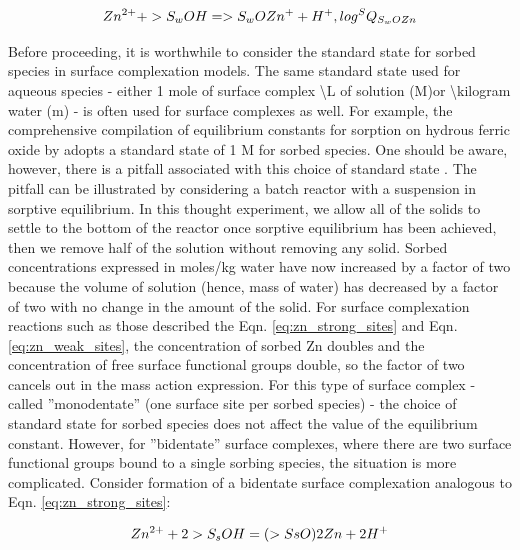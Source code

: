 \begin{equation}
Zn^{2+}  +  >S_wOH  =  >S_wOZn^+  + H^+,  log  ^SQ_{S_wOZn}   \\
\label{eq:zn_weak_sites}
\end{equation} 

Before proceeding, it is worthwhile to consider the standard state for sorbed species 
in surface complexation models. 
The same standard state used for aqueous species - either 1 mole of surface complex \textbackslash L of solution (M)or \textbackslash kilogram water (m) - is often used for surface complexes as well. For example, the comprehensive compilation of equilibrium constants for sorption on hydrous ferric oxide by \cite{Dzombak1990} adopts a standard state of 1 M for sorbed species.  
One should be aware, however, there is a pitfall associated with this choice of 
standard state %
\citep[e.g.,][]{appelo_postma_1999}. 
The pitfall can be illustrated by considering a batch reactor with a suspension in sorptive equilibrium. 
In this thought experiment, we allow all of the solids to settle to the bottom of 
the reactor once sorptive equilibrium has been achieved, then we remove half of the solution without removing any solid.
Sorbed concentrations expressed in moles/kg water have now increased by a factor of two because the volume of solution (hence, mass of water) 
has decreased by a factor of two with no change in the amount of the solid.  
For surface complexation reactions such as those described the Eqn. \ref{eq:zn_strong_sites} 
and Eqn. \ref{eq:zn_weak_sites}, 
the concentration of sorbed Zn doubles and the concentration of free surface functional groups double,
so the factor of two cancels out in the mass action expression.  
For this type of surface complex - 
called ''monodentate'' (one surface site per sorbed species) -
the choice of standard state for sorbed species does not affect the value of the equilibrium constant. 
However, for ''bidentate'' surface complexes, where there are two surface functional groups 
bound to a single sorbing species, the situation is more complicated.  
Consider formation of a bidentate surface complexation analogous 
to Eqn. \ref{eq:zn_strong_sites}:

\begin{equation}
Zn^{2+}  +  2>S_sOH    =  (>SsO)2Zn + 2H^+  \\
\label{eq:zn_2}
\end{equation}

